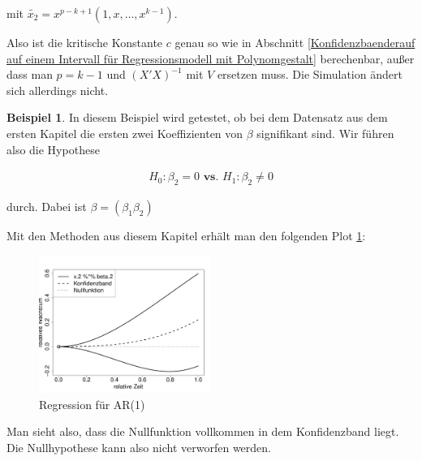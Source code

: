 \documentclass[12pt,a4paper]{article}
\theoremstyle{definition}
\newtheorem{Beispiel}[Definition]{Beispiel}
\theoremstyle{definition}
\theoremstyle{definition}
\theoremstyle{definition}
\begin{document}
mit $\tilde{x_2}= x^{p-k+1}(1, x, \ldots, x^{k-1})$.

Also ist die kritische Konstante $c$ genau so wie in Abschnitt \ref{Konfidenzbaenderauf auf einem Intervall für Regressionsmodell mit Polynomgestalt} berechenbar, außer dass man $p=k-1$ und $(X'X)^{-1}$ mit $V$ ersetzen muss. Die Simulation ändert sich allerdings nicht.

\begin{Beispiel}
In diesem Beispiel wird getestet, ob bei dem Datensatz aus dem ersten Kapitel die ersten zwei Koeffizienten von $\beta$ signifikant sind. Wir führen also die Hypothese

\begin{align*}
H_{0} : \beta_{2} = 0  \textbf{ vs. }  H_{1} : \beta_{2} \neq 0
\end{align*}

durch. Dabei ist $\beta = (\beta_{1} \beta_{2})$

Mit den Methoden aus diesem Kapitel erhält man den folgenden Plot \ref{Bsp-KB-nested}:

\begin{figure}[H] 
  \centering
     \includegraphics[width=0.5\textwidth]{Bsp-KB-nested}
  \caption{Regression für AR(1)}
  \label{Bsp-KB-nested}
\end{figure}

Man sieht also, dass die Nullfunktion vollkommen in dem Konfidenzband liegt. Die Nullhypothese kann also nicht verworfen werden.

\end{Beispiel}
\end{document}
